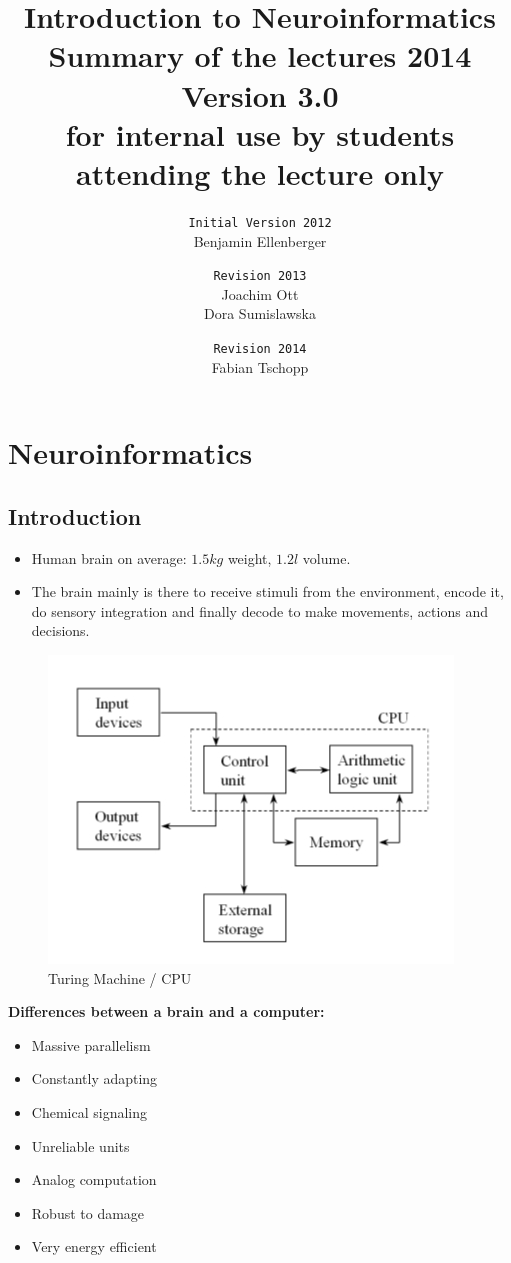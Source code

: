 \documentclass[a4paper, 12pt]{article}
\title{\textbf{Introduction to Neuroinformatics} \\Summary of the lectures
2014\\\normalsize Version 3.0 \\
for internal use by students attending the lecture only}
\author{
\texttt{Initial Version 2012}\\
	Benjamin Ellenberger
\and
\texttt{Revision 2013}\\
	Joachim Ott\\Dora Sumislawska
\and
\texttt{Revision 2014}\\
	Fabian Tschopp}
\date{}
\begin{document}
\maketitle
\newpage
\tableofcontents
\newpage

\section{Neuroinformatics}
\subsection{Introduction}
\begin{itemize}[noitemsep,nolistsep]
	\item Human brain on average: $1.5 kg$ weight, $1.2 l$ volume.
	\item The brain mainly is there to receive stimuli from the environment, encode it, do sensory integration and finally decode to make movements, actions and decisions.
\end{itemize}
\begin{figure}[htbp]
	\centering
	\includegraphics[scale=0.6]{1_2.jpg}
 	\caption{Turing Machine / CPU}
\end{figure} 
\textbf{Differences between a brain and a computer:}
\begin{itemize}[noitemsep,nolistsep]
	\item Massive parallelism
	\item Constantly adapting
	\item Chemical signaling
	\item Unreliable units
	\item Analog computation
	\item Robust to damage
	\item Very energy efficient
\end{itemize}
\end{document}
